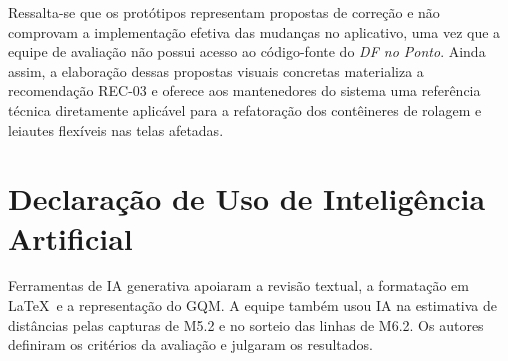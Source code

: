 \documentclass[11pt,a4paper]{article}
\begin{document}
Ressalta-se que os protótipos representam propostas de correção e não comprovam a implementação efetiva das mudanças no aplicativo, uma vez que a equipe de avaliação não possui acesso ao código-fonte do \textit{DF no Ponto}. Ainda assim, a elaboração dessas propostas visuais concretas materializa a recomendação REC-03 e oferece aos mantenedores do sistema uma referência técnica diretamente aplicável para a refatoração dos contêineres de rolagem e leiautes flexíveis nas telas afetadas.

\section*{Declaração de Uso de Inteligência Artificial}
\label{sec:ia}

Ferramentas de IA generativa apoiaram a revisão textual, a formatação em \LaTeX\ e a representação do GQM. A equipe também usou IA na estimativa de distâncias pelas capturas de M5.2 e no sorteio das linhas de M6.2. Os autores definiram os critérios da avaliação e julgaram os resultados.
\end{document}
